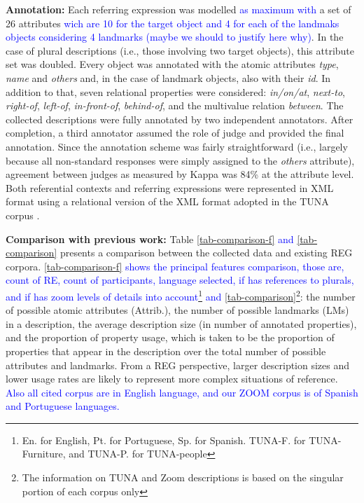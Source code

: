 \documentclass[11pt]{article}
\begin{document}
{\bf Annotation:} Each referring expression was modelled \textcolor{blue}{as maximum with} a set of 26 attributes \textcolor{blue}{wich are 10 for the target object and 4 for each of the landmaks objects considering 4 landmarks (maybe we should to justify here why)}. In the case of plural descriptions (i.e., those involving two target objects), this attribute set was doubled. Every object was annotated with the atomic attributes {\em type}, {\em name} and {\em others} and, in the case of landmark objects, also with their {\em id}. In addition to that, seven relational properties were considered: {\em in/on/at}, {\em next-to}, {\em right-of}, {\em left-of}, {\em in-front-of}, {\em behind-of}, and the multivalue relation {\em between}. The collected descriptions were fully annotated by two independent annotators. After completion, a third annotator assumed the role of judge and provided the final annotation. Since the annotation scheme was fairly straightforward (i.e., largely because all non-standard responses were simply assigned to the {\em others} attribute), agreement between judges as measured by Kappa \cite{kappa} was 84\% at the attribute level. Both referential contexts and referring expressions were represented in XML format using a relational version of the XML format adopted in the TUNA corpus \cite{tuna-corpus}. 

{\bf Comparison with previous work:} Table \textcolor{blue}{\ref{tab-comparison-f} and }\ref{tab-comparison} presents a comparison between the collected data and existing REG corpora. \textcolor{blue}{\ref{tab-comparison-f} shows the principal features comparison, those are, count of RE, count of participants, language selected, if has references to plurals, and if has zoom levels of details into account\footnote{En. for English, Pt. for Portuguese, Sp. for Spanish. TUNA-F. for TUNA-Furniture, and TUNA-P. for TUNA-people} and \ref{tab-comparison}}\footnote{The information on TUNA and Zoom descriptions is based on the singular portion of each corpus only}: the number of possible atomic attributes (Attrib.), the number of possible landmarks (LMs) in a  description, the average description size (in number of annotated properties), and the proportion of property usage, which is taken to be the proportion of properties that appear in the description over the total number of possible attributes and landmarks. From a REG perspective, larger description sizes and lower usage rates are likely to represent more complex situations of reference. \textcolor{blue}{Also all cited corpus are in English language, and our ZOOM corpus is of Spanish and Portuguese languages.}
\end{document}
